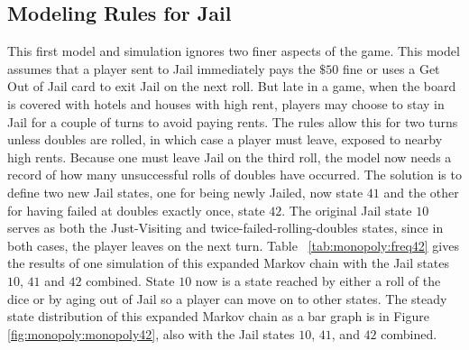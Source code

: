 \documentclass[12pt]{article}
\begin{document}
\subsection*{Modeling Rules for Jail}

This first model and simulation ignores two finer aspects of the game.
This model assumes that a player sent to Jail immediately pays the \( \$50
\) fine or uses a Get Out of Jail card to exit Jail on the next
roll.  But late in a game, when the board is covered with hotels and
houses with high rent, players may choose to stay in Jail for a couple
of turns to avoid paying rents. The rules allow this for two turns
unless doubles are rolled, in which case a player must leave, exposed to
nearby high rents.  Because one must leave Jail on the third roll, the
model now needs a record of how many unsuccessful rolls of doubles have
occurred.  The solution is to define two new Jail states, one for being
newly Jailed, now state \( 41 \) and the other for having failed at
doubles exactly once, state \( 42 \). The original Jail state \( 10 \)
serves as both the Just-Visiting and twice-failed-rolling-doubles
states, since in both cases, the player leaves on the next turn.  Table~%
\ref{tab:monopoly:freq42} gives the results of one simulation of this
expanded Markov chain with the Jail states \( 10 \), \( 41 \) and \( 42 \)
combined.  State \( 10 \) now is a state reached by either a roll of the
dice or by aging out of Jail so a player can move on to other states.
The steady state distribution of this expanded Markov chain as a bar
graph is in Figure~%
\ref{fig:monopoly:monopoly42}, also with the Jail states \( 10 \), \( 41
\), and \( 42 \) combined.
\end{document}
